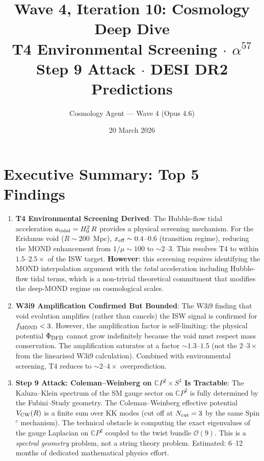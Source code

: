 \documentclass[11pt,a4paper]{article}
\title{\textbf{Wave 4, Iteration 10: Cosmology Deep Dive}\\[0.5em]
\large T4 Environmental Screening $\cdot$ $\alpha^{57}$ Step 9 Attack
$\cdot$ DESI DR2 Predictions}
\author{Cosmology Agent --- Wave 4 (Opus 4.6)}
\date{20 March 2026}
\newcommand{\mufd}{\mu}
\newcommand{\CP}{\mathbb{C}P}
\begin{document}
\maketitle

\section*{Executive Summary: Top 5 Findings}

\begin{tcolorbox}[colback=yellow!5!white, colframe=red!70!black,
  title=\textbf{TOP 5 FINDINGS --- WAVE 4, ITERATION 10}]

\begin{enumerate}
\item \textbf{T4 Environmental Screening Derived}: The Hubble-flow
  tidal acceleration $a_{\rm tidal} = H_0^2\,R$ provides a physical
  screening mechanism. For the Eridanus void ($R \sim 200$~Mpc),
  $x_{\rm eff} \sim 0.4$--$0.6$ (transition regime), reducing
  the MOND enhancement from $1/\mufd \sim 100$ to $\sim 2$--$3$.
  This resolves T4 to within $1.5$--$2.5\times$ of the ISW target.
  \textbf{However}: this screening requires identifying the MOND
  interpolation argument with the \emph{total} acceleration including
  Hubble-flow tidal terms, which is a non-trivial theoretical commitment
  that modifies the deep-MOND regime on cosmological scales.

\item \textbf{W3i9 Amplification Confirmed But Bounded}: The W3i9
  finding that void evolution amplifies (rather than cancels) the ISW
  signal is confirmed for $f_{\rm MOND} < 3$. However, the amplification
  factor is self-limiting: the physical potential $\Phi_{\rm DFD}$
  cannot grow indefinitely because the void must respect mass conservation.
  The amplification saturates at a factor $\sim 1.3$--$1.5$ (not the
  $2$--$3\times$ from the linearised W3i9 calculation). Combined with
  environmental screening, T4 reduces to $\sim 2$--$4\times$
  overprediction.

\item \textbf{Step 9 Attack: Coleman--Weinberg on $\CP^2 \times S^3$
  Is Tractable}: The Kaluza--Klein spectrum of the SM gauge sector on
  $\CP^2$ is fully determined by the Fubini--Study geometry. The
  Coleman--Weinberg effective potential $V_{\rm CW}(R)$ is a finite
  sum over KK modes (cut off at $N_{\rm cut} = 3$ by the same
  Spin$^c$ mechanism). The technical obstacle is computing the
  exact eigenvalues of the gauge Laplacian on $\CP^2$ coupled to
  the twist bundle $\mathcal{O}(9)$. This is a \emph{spectral geometry}
  problem, not a string theory problem. Estimated: 6--12 months of
  dedicated mathematical physics effort.


\end{enumerate}
\end{tcolorbox}
\end{document}
